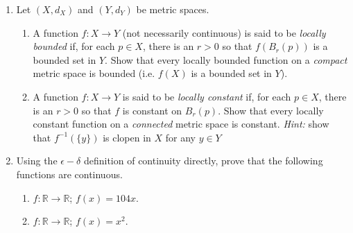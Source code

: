 \documentclass[12pt, letterpaper]{article}
\newcommand{\0}{\mathbf{0}}
\newcommand{\1}{\mathbf{1}}
\begin{document}
\begin{enumerate}
\begin{enumerate}
        \item 
        Let $E \subset X$. Show that $E \subset f^{-1}(f(E))$. Show that equality holds for all $E$ if and only if $f$ is injective.

        \item 
        Let $E \subset Y$. Show that $f(f^{-1}(E)) \subset E$. Show that equality holds for all $E$ if and only if $f$ is surjective.
        
    \end{enumerate}

    \newpage

    \item 
    Let $(X, d_X)$ and $(Y, d_Y)$ be metric spaces.
    \begin{enumerate}
        \item 
        A function $f : X \to Y$ (not necessarily continuous) is said to be \textit{locally bounded} if, for each $p \in X$, there is an $r > 0$ so that $f(B_r(p))$ is a bounded set in $Y$. Show that every locally bounded function on a \textit{compact} metric space is bounded (i.e. $f(X)$ is a bounded set in $Y$).\\

        \item 
        A function $f : X \to Y$ is said to be \textit{locally constant} if, for each $p \in X$, there is an $r > 0$ so that $f$ is constant on $B_r(p)$. Show that every locally constant function on a \textit{connected} metric space is constant. \textit{Hint:} show that $f^{-1}(\{y\})$ is clopen in $X$ for any $y \in Y$
        
    \end{enumerate}

    \vspace{0.5cm}

    \item 
    Using the $\epsilon-\delta$ definition of continuity directly, prove that the following functions are continuous.
    \begin{enumerate}
        \item 
        $f : \mathbb{R} \to \mathbb{R}$; \quad $f(x) = 104x$.\\

        \item 
        $f : \mathbb{R} \to \mathbb{R}$; \quad $f(x) = x^2$.\\
        
    \end{enumerate}


\end{enumerate}
\end{document}
